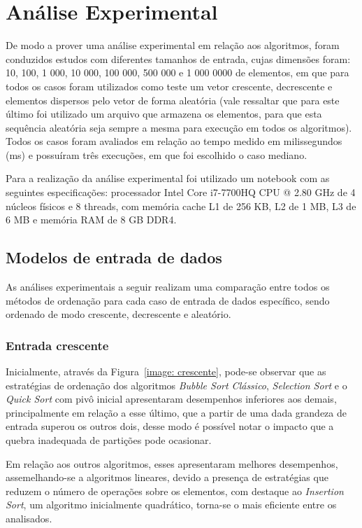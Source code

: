 \documentclass[conference]{IEEEtran}
\begin{document}
\section{Análise Experimental}

De modo a prover uma análise experimental em relação aos algoritmos, foram conduzidos estudos com diferentes tamanhos de entrada, cujas dimensões foram: 10, 100, 1 000, 10 000, 100 000, 500 000 e 1 000 0000 de elementos, em que para todos os casos foram utilizados como teste um vetor crescente, decrescente e elementos dispersos pelo vetor de forma aleatória (vale ressaltar que para este último foi utilizado um arquivo que armazena os elementos, para que esta sequência aleatória seja sempre a mesma para execução em todos os algoritmos). Todos os casos foram avaliados em relação ao tempo medido em milissegundos (ms) e possuíram três execuções, em que foi escolhido o caso mediano. 

Para a realização da análise experimental foi utilizado um notebook com as seguintes especificações: processador Intel Core i7-7700HQ CPU @ 2.80 GHz de 4 núcleos físicos e 8 threads, com memória cache L1 de 256 KB, L2 de 1 MB, L3 de 6 MB e memória RAM de 8 GB DDR4.


\subsection{Modelos de entrada de dados}
As análises experimentais a seguir realizam uma comparação entre todos os métodos de ordenação para cada caso de entrada de dados específico, sendo ordenado de modo crescente, decrescente e aleatório.
~\\
\subsubsection{Entrada crescente}

Inicialmente, através da Figura~\ref{image: crescente}, pode-se observar que as estratégias de ordenação dos algoritmos \textit{Bubble Sort Clássico}, \textit{Selection Sort} e o \textit{Quick Sort} com pivô inicial apresentaram desempenhos inferiores aos demais, principalmente em relação a esse último, que a partir de uma dada grandeza de entrada superou os outros dois, desse modo é possível notar o impacto que a quebra inadequada de partições pode ocasionar.

Em relação aos outros algoritmos, esses apresentaram melhores desempenhos, assemelhando-se a algoritmos lineares, devido a presença de estratégias que reduzem o número de operações sobre os elementos, com destaque ao \textit{Insertion Sort}, um algoritmo inicialmente quadrático, torna-se o mais eficiente entre os analisados.
\end{document}
